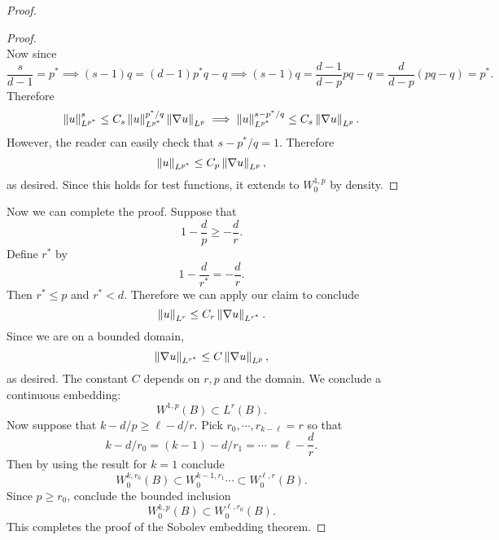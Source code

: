 \begin{proof}
\begin{claim}
\begin{proof}
\begin{equation*}
  \end{equation*}
  Now since
  \begin{equation*}
    \frac{s}{d-1}=p^{*}\implies (s-1)q=(d-1)p^{*}q-q\implies (s-1)q=\frac{d-1}{d-p}pq-q=\frac{d}{d-p}(pq-q)=p^{*}.
  \end{equation*}
  Therefore
  \begin{equation*}
    \left\lVert u\right\rVert_{L^{p^{*}}}^{s}\le C_{s}\left\lVert u\right\rVert_{L^{p^{*}}}^{p^{*}/q}\left\lVert\nabla u\right\rVert_{L^{p}}\implies \left\lVert u\right\rVert_{L^{p^{*}}}^{s-p^{*}/q}\le C_{s}\left\lVert\nabla u\right\rVert_{L^{p}}.
  \end{equation*}
  However, the reader can easily check that $s-p^{*}/q=1$. Therefore
  \begin{equation*}
    \left\lVert u\right\rVert_{L^{p^{*}}}\le C_{p}\left\lVert\nabla u\right\rVert_{L^{p}},
  \end{equation*}
  as desired. Since this holds for test functions, it extends to $W^{1,p}_{0}$ by density. \end{proof}
\end{claim}

Now we can complete the proof. Suppose that
\begin{equation*}
  1-\frac{d}{p}\ge -\frac{d}{r}.
\end{equation*}
Define $r^{*}$ by
\begin{equation*}
  1-\frac{d}{r^{*}}=-\frac{d}{r}.
\end{equation*}
Then $r^{*}\le p$ and $r^{*}<d$. Therefore we can apply our claim to conclude
\begin{equation*}
  \left\lVert u\right\rVert_{L^{r}}\le C_{r}\left\lVert\nabla u\right\rVert_{L^{r^{*}}}.
\end{equation*}
Since we are on a bounded domain,
\begin{equation*}
  \left\lVert\nabla u\right\rVert_{L^{r^{*}}}\le C\left\lVert\nabla u\right\rVert_{L^{p}},
\end{equation*}
as desired. The constant $C$ depends on $r,p$ and the domain. We conclude a continuous embedding:
\begin{equation*}
  W^{1,p}(B)\subset L^{r}(B).
\end{equation*}
Now suppose that $k-d/p\ge \ell-d/r$. Pick $r_{0},\cdots,r_{k-\ell}=r$ so that
\begin{equation*}
  k-d/r_{0}=(k-1)-d/r_{1}=\cdots=\ell-\frac{d}{r}.
\end{equation*}
Then by using the result for $k=1$ conclude
\begin{equation*}
  W^{k,r_{0}}_{0}(B)\subset W^{k-1,r_{1}}_{0}\cdots \subset W^{\ell,r}_{0}(B).
\end{equation*}
Since $p\ge r_{0}$, conclude the bounded inclusion
\begin{equation*}
  W^{k,p}_{0}(B)\subset W^{\ell,r_{0}}_{0}(B).
\end{equation*}
This completes the proof of the Sobolev embedding theorem. 
\end{proof}
